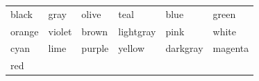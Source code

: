 \documentclass{article}
\newcommand\myfcolorbox[1]{\fcolorbox{black}{#1}{\phantom{\tiny{color}}} #1\quad}
\begin{document}
\begin{center}
	\begin{tabular}{llllll}
		\myfcolorbox{black} & \myfcolorbox{gray} & \myfcolorbox{olive} & \myfcolorbox{teal} & \myfcolorbox{blue} & \myfcolorbox{green}\\
		\myfcolorbox{orange} & \myfcolorbox{violet} & \myfcolorbox{brown} & \myfcolorbox{lightgray} & \myfcolorbox{pink} & \myfcolorbox{white}\\
		\myfcolorbox{cyan} & \myfcolorbox{lime} & \myfcolorbox{purple} & \myfcolorbox{yellow} & \myfcolorbox{darkgray} & \myfcolorbox{magenta}\\
		\myfcolorbox{red}
	\end{tabular}
\end{center}
\end{document}
